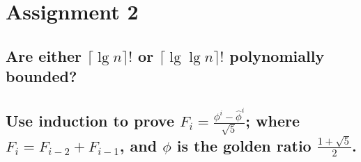 \chapter{Assignment 2}

\section[Problem 1]{Are either $\lceil \lg n \rceil!$ or $\lceil \lg \lg n \rceil!$ polynomially bounded?}


\section[Problem 2]{Use induction to prove $F_i = \frac{\phi^i - \hat{\phi}^i}{\sqrt{5}}$; where $F_i = F_{i-2} + F_{i-1}$, and $\phi$ is the golden ratio $\frac{1 + \sqrt{5}}{2}$.}
